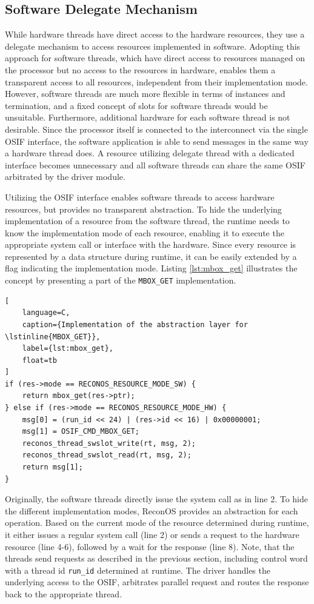 \subsection{Software Delegate Mechanism}

While hardware threads have direct access to the hardware resources, they use
a delegate mechanism to access resources implemented in software. Adopting
this approach for software threads, which have direct access to resources
managed on the processor but no access to the resources in hardware, enables
them a transparent access to all resources, independent from their
implementation mode. However, software threads are much more flexible in terms
of instances and termination, and a fixed concept of slots for software
threads would be unsuitable. Furthermore, additional hardware for each
software thread is not desirable. Since the processor itself is connected to
the interconnect via the single \ac{OSIF} interface, the software application
is able to send messages in the same way a hardware thread does. A resource
utilizing delegate thread with a dedicated interface becomes unnecessary and
all software threads can share the same \ac{OSIF} arbitrated by the driver
module.

Utilizing the \ac{OSIF} interface enables software threads to access hardware
resources, but provides no transparent abstraction. To hide the underlying
implementation of a resource from the software thread, the runtime needs to
know the implementation mode of each resource, enabling it to execute the
appropriate system call or interface with the hardware. Since every resource
is represented by a data structure during runtime, it can be easily extended
by a flag indicating the implementation mode. Listing
\ref{lst:mbox_get} illustrates the concept by presenting a part of the
\lstinline{MBOX_GET} implementation.
\begin{lstlisting}[
	language=C,
	caption={Implementation of the abstraction layer for \lstinline{MBOX_GET}},
	label={lst:mbox_get},
	float=tb
]
if (res->mode == RECONOS_RESOURCE_MODE_SW) {
	return mbox_get(res->ptr);
} else if (res->mode == RECONOS_RESOURCE_MODE_HW) {
	msg[0] = (run_id << 24) | (res->id << 16) | 0x00000001;
	msg[1] = OSIF_CMD_MBOX_GET;
	reconos_thread_swslot_write(rt, msg, 2);
	reconos_thread_swslot_read(rt, msg, 2);
	return msg[1];
}
\end{lstlisting}
Originally, the software threads directly issue the system call as in line 2.
To hide the different implementation modes, ReconOS provides an abstraction
for each operation. Based on the current mode of the resource determined
during runtime, it either issues a regular system call (line 2) or sends a
request to the hardware resource (line 4-6), followed by a wait for the
response (line 8). Note, that the threads send requests as described in the
previous section, including control word with a thread id \lstinline{run_id}
determined at runtime. The driver handles the underlying access to the
\ac{OSIF}, arbitrates parallel request and routes the response back to the
appropriate thread.

